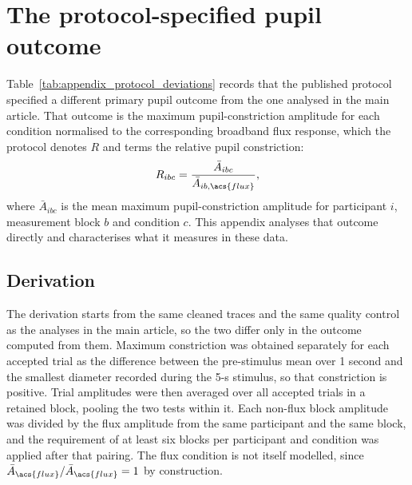 %
%
%   
%   
%   
\begin{appendixbox}
\label{app:protocol_plr}
\section{The protocol-specified pupil outcome}

Table~\ref{tab:appendix_protocol_deviations} records that the published protocol specified a different primary pupil outcome from the one analysed in the main article. That outcome is the maximum pupil-constriction amplitude for each condition normalised to the corresponding broadband \acs{flux} response, which the protocol denotes $R$ and terms the relative pupil constriction:
%
\begin{equation}
\label{eq:appendix_protocol_ratio}
R_{ibc} = \frac{\bar{A}_{ibc}}{\bar{A}_{ib,\acs{flux}}},
\end{equation}
%
where $\bar{A}_{ibc}$ is the mean maximum pupil-constriction amplitude for participant $i$, measurement block $b$ and condition $c$. This appendix analyses that outcome directly and characterises what it measures in these data.

\subsection{Derivation}

The derivation starts from the same cleaned traces and the same quality control as the analyses in the main article, so the two differ only in the outcome computed from them. Maximum constriction was obtained separately for each accepted trial as the difference between the pre-stimulus mean over 1 second and the smallest diameter recorded during the 5-s stimulus, so that constriction is positive. Trial amplitudes were then averaged over all accepted trials in a retained block, pooling the two tests within it. Each non-\acs{flux} block amplitude was divided by the \acs{flux} amplitude from the same participant and the same block, and the requirement of at least six blocks per participant and condition was applied after that pairing. The \acs{flux} condition is not itself modelled, since $\bar{A}_{\acs{flux}}/\bar{A}_{\acs{flux}} = 1$ by construction.


\end{appendixbox}

